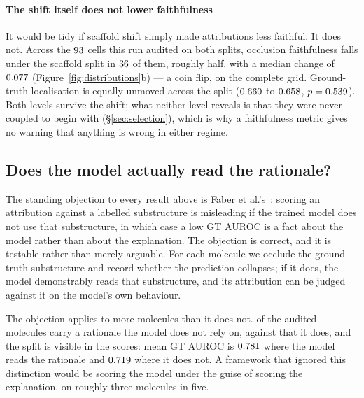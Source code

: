 \paragraph{The shift itself does not lower faithfulness} It would be tidy if
scaffold shift simply made attributions less faithful. It does not. Across the
$93{}$ cells this run audited on both splits, occlusion faithfulness
falls under the scaffold split in $36{}$ of them, roughly half, with
a median change of $0.077{}$ (Figure~\ref{fig:distributions}b) ---
a coin flip, on the complete grid. Ground-truth localisation is equally
unmoved across the split ($0.660{}$ to $0.658{}$,
$p=0.539{}$). Both levels survive the shift; what neither level
reveals is that they were never coupled to begin with
(\S\ref{sec:selection}), which is why a faithfulness metric gives no warning
that anything is wrong in either regime.

\subsection{Does the model actually read the rationale?}
\label{sec:rationale}

\ifHasFaberPartition
The standing objection to every result above is Faber et al.'s~\cite{faber}:
scoring an attribution against a labelled substructure is misleading if the
trained model does not use that substructure, in which case a low GT AUROC is a
fact about the model rather than about the explanation. The objection is
correct, and it is testable rather than merely arguable. For each molecule we
occlude the ground-truth substructure and record whether the prediction
collapses; if it does, the model demonstrably reads that substructure, and its
attribution can be judged against it on the model's own behaviour.

The objection applies to more molecules than it does not.
\nFaberIgnores{} of the audited molecules carry a rationale the model does not
rely on, against \nFaberUses{} that it does, and the split is visible in the
scores: mean GT AUROC is $0.781{}$ where the model reads the rationale
and $0.719{}$ where it does not. A framework that ignored this
distinction would be scoring the model under the guise of scoring the
explanation, on roughly three molecules in five.

